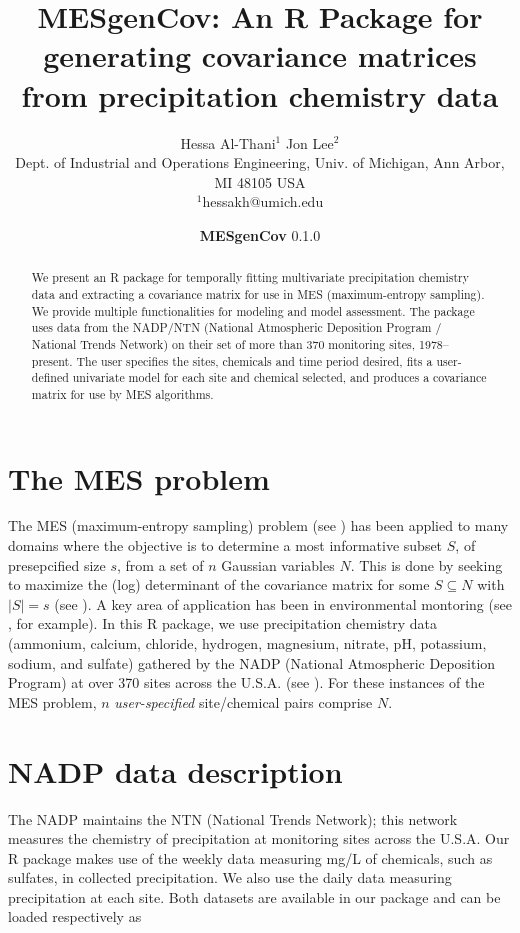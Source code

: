 \documentclass[11pt]{article}\usepackage[]{graphicx}\usepackage[]{color}
\title{MESgenCov: An R Package for generating covariance matrices \\ from precipitation chemistry data}
\author{Hessa Al-Thani$^1$ \qquad Jon Lee$^2$\\[0.35cm]
  {\small Dept. of Industrial and Operations Engineering, Univ. of Michigan, Ann Arbor, MI 48105 USA }\\[0.35cm]{\small{$^1$hessakh@umich.edu}} \qquad {\small{$^2$jonxlee@umich.edu}}
}
\date{\textbf{MESgenCov} 0.1.0  }
\begin{document}
\maketitle

\begin{abstract}
  We present an R package for temporally fitting multivariate precipitation chemistry data and extracting a covariance matrix
for use in MES (maximum-entropy sampling).
 We provide multiple functionalities for modeling and model assessment. The package uses data from the NADP/NTN (National Atmospheric Deposition Program / National Trends Network) on their set of more than 370 monitoring sites, 1978--present. The user specifies the sites, chemicals and time period desired, fits a user-defined univariate model for each site and chemical selected, and produces a covariance matrix for use by MES algorithms.

\end{abstract}

\section{The MES problem}

The MES (maximum-entropy sampling) problem (see \cite{ShewryWynn,SebWynn,FedorovLee,LeeEnv}) has been applied to many domains where the objective is to determine a most informative subset $S$, of presepcified size $s$, from a set of $n$ Gaussian variables $N$. This is done by seeking to maximize the (log) determinant of the covariance matrix for some $S \subseteq N$ with $|S|=s$ (see \cite{KLQ,LeeConstrained,AFLW_Using,LeeWilliams_ILP,HLW,AnstreicherLee_Masked,BurerLee,AnstreicherBQPEntropy,linx}). A key area of application has been in environmental montoring (see \cite{Zidek1,Zidek2,Zidek3}, for example).
In this R package, we use  precipitation chemistry data
(ammonium,
calcium,
chloride,
hydrogen,
 magnesium,
 nitrate,
pH,
 potassium,
  sodium, and
sulfate) gathered by the NADP (National Atmospheric Deposition Program) at over 370 sites across the U.S.A. (see \cite{NADPNTN}).
For these instances of the MES problem, $n$ \emph{user-specified} site/chemical pairs comprise $N$.

\section{NADP data description}

The NADP maintains the NTN (National Trends Network); this network measures the chemistry of precipitation at monitoring sites across the
U.S.A. Our R package makes use of the weekly data measuring  mg/L of chemicals, such as sulfates, in collected precipitation. We also use the daily data measuring precipitation at each site. Both datasets are available in our package and can be loaded respectively as
\end{document}
